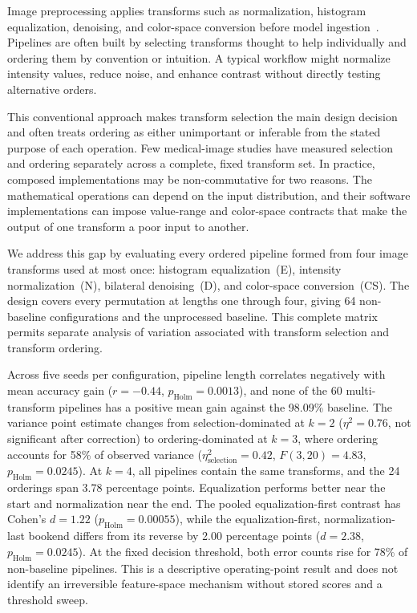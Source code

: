 \documentclass[preprint,review,12pt]{elsarticle}
\begin{document}
Image preprocessing applies transforms such as normalization, histogram equalization, denoising, and color-space conversion before model ingestion~\cite{RODRIGUES2020103542, 9548351, Tarawneh2024}. Pipelines are often built by selecting transforms thought to help individually and ordering them by convention or intuition. A typical workflow might normalize intensity values, reduce noise, and enhance contrast without directly testing alternative orders.

This conventional approach makes transform selection the main design decision and often treats ordering as either unimportant or inferable from the stated purpose of each operation. Few medical-image studies have measured selection and ordering separately across a complete, fixed transform set. In practice, composed implementations may be non-commutative for two reasons. The mathematical operations can depend on the input distribution, and their software implementations can impose value-range and color-space contracts that make the output of one transform a poor input to another.

We address this gap by evaluating every ordered pipeline formed from four image transforms used at most once: histogram equalization~(E), intensity normalization~(N), bilateral denoising~(D), and color-space conversion~(CS). The design covers every permutation at lengths one through four, giving 64 non-baseline configurations and the unprocessed baseline. This complete matrix permits separate analysis of variation associated with transform selection and transform ordering.

Across five seeds per configuration, pipeline length correlates negatively with mean accuracy gain ($r=-0.44$, $p_{\mathrm{Holm}}=0.0013$), and none of the 60 multi-transform pipelines has a positive mean gain against the 98.09\% baseline. The variance point estimate changes from selection-dominated at $k=2$ ($\eta^2=0.76$, not significant after correction) to ordering-dominated at $k=3$, where ordering accounts for 58\% of observed variance ($\eta^2_{\text{selection}}=0.42$, $F(3,20)=4.83$, $p_{\mathrm{Holm}}=0.0245$). At $k=4$, all pipelines contain the same transforms, and the 24 orderings span 3.78 percentage points. Equalization performs better near the start and normalization near the end. The pooled equalization-first contrast has Cohen's $d=1.22$ ($p_{\mathrm{Holm}}=0.00055$), while the equalization-first, normalization-last bookend differs from its reverse by 2.00 percentage points ($d=2.38$, $p_{\mathrm{Holm}}=0.0245$). At the fixed decision threshold, both error counts rise for 78\% of non-baseline pipelines. This is a descriptive operating-point result and does not identify an irreversible feature-space mechanism without stored scores and a threshold sweep.
\end{document}

